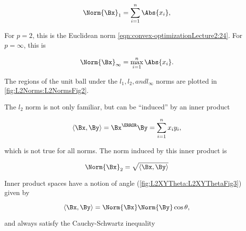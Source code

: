 \begin{dmath}\label{eqn:convex-optimizationLecture2:64}
\Norm{\Bx}_1 = \sum_{i = 1}^n \Abs{x_i},
\end{dmath}

For \( p = 2 \), this is the Euclidean norm \cref{eqn:convex-optimizationLecture2:24}.
For \( p = \infty \), this is

\begin{dmath}\label{eqn:convex-optimizationLecture2:324}
\Norm{\Bx}_\infty = \max_{i = 1}^n \Abs{x_i}.
\end{dmath}


The regions of the unit ball under the \( l_1, l_2, and l_\infty \) norms are plotted in \cref{fig:L2Norms:L2NormsFig2}.


The \( l_2 \) norm is not only familiar, but can be ``induced'' by an inner product

\begin{equation}\label{eqn:convex-optimizationLecture2:84}
\innerproduct{\Bx}{\By} = \Bx^\T \By = \sum_{i = 1}^n x_i y_i,
\end{equation}

which is not true for all norms.  The norm induced by this inner product is

\begin{dmath}\label{eqn:convex-optimizationLecture2:104}
\Norm{\Bx}_2 = \sqrt{ \innerproduct{\Bx}{\By} }
\end{dmath}

Inner product spaces have a notion of angle 
(\cref{fig:L2XYTheta:L2XYThetaFig3})
given by

\begin{dmath}\label{eqn:convex-optimizationLecture2:124}
\innerproduct{\Bx}{\By} = \Norm{\Bx} \Norm{\By} \cos \theta,
\end{dmath}

and always satisfy the Cauchy-Schwartz inequality

